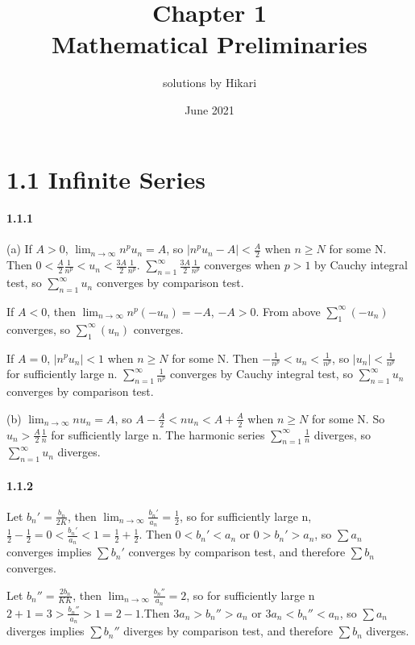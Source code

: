 \documentclass[a4paper]{article}
\title{Chapter 1\\Mathematical Preliminaries}
\author{solutions by Hikari}
\date{June 2021}
\begin{document}
\maketitle

\section*{1.1 Infinite Series}

\paragraph{1.1.1}
(a) If $A>0$, $\lim_{n\to \infty}n^p u_n=A$, so $|n^p u_n-A|< \frac{A}{2}$ when $n\geq N$ for some N. Then $0<\frac{A}{2}\frac{1}{n^p}<u_n<\frac{3A}{2}\frac{1}{n^p}$. $\sum_{n=1}^{\infty}\frac{3A}{2}\frac{1}{n^p}$ converges when $p>1$ by Cauchy integral test, so $\sum_{n=1}^{\infty}u_n$ converges by comparison test.

If $A<0$, then $\lim_{n\to \infty}n^p(-u_n)=-A$, $-A>0$. From above $\sum_1^\infty(-u_n)$ converges, so $\sum_1^\infty(u_n)$ converges.

If $A=0$, $|n^p u_n|< 1$ when $n\geq N$ for some N. Then $-\frac{1}{n^p}<u_n<\frac{1}{n^p}$, so $|u_n|<\frac{1}{n^p}$ for sufficiently large n. $\sum_{n=1}^\infty \frac{1}{n^p}$ converges by Cauchy integral test, so $\sum_{n=1}^{\infty}u_n$ converges by comparison test.
\medskip

(b) $\lim_{n\to\infty}nu_n=A$, so $A-\frac{A}{2}<nu_n<A+\frac{A}{2}$ when $n\geq N$ for some N. So $u_n>\frac{A}{2}\frac{1}{n}$ for sufficiently large n. The harmonic series $\sum_{n=1}^\infty\frac{1}{n}$ diverges, so $\sum_{n=1}^\infty u_n$ diverges.

\paragraph{1.1.2}
Let $b_n'=\frac{b_n}{2K}$, then $\lim_{n\to\infty}\frac{b_n'}{a_n}=\frac{1}{2}$, so for sufficiently large n, $\frac{1}{2}-\frac{1}{2}=0<\frac{b_n'}{a_n}<1=\frac{1}{2}+\frac{1}{2}$. Then $0<b_n'<a_n$ or $0>b_n'>a_n$, so $\sum a_n$ converges implies $\sum b_n'$ converges by comparison test\footnotemark, and therefore $\sum b_n$ converges.

Let $b_n''=\frac{2b_n}{KK}$, then $\lim_{n\to\infty}\frac{b_n''}{a_n}=2$, so for sufficiently large n $2+1=3>\frac{b_n''}{a_n}>1=2-1$.Then $3a_n>b_n''>a_n$ or $3a_n<b_n''<a_n$,  so $\sum a_n$ diverges implies $\sum b_n''$ diverges by comparison test\footnotemark[\value{footnote}], and therefore $\sum b_n$ diverges.
\end{document}
